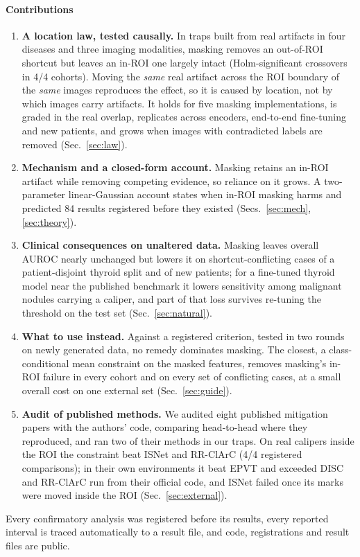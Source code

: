 \documentclass[review,3p]{elsarticle}
\begin{document}
\paragraph{Contributions}
\begin{enumerate}
\item \textbf{A location law, tested causally.} In traps built from real artifacts in four diseases and three imaging
modalities, masking removes an out-of-ROI shortcut but leaves an in-ROI one largely intact (Holm-significant
crossovers in 4/4 cohorts). Moving the \emph{same} real artifact across the ROI boundary of the \emph{same} images
reproduces the effect, so it is caused by location, not by which images carry artifacts. It holds for five masking
implementations, is graded in the real overlap, replicates across encoders, end-to-end fine-tuning and new patients,
and grows when images with contradicted labels are removed (Sec.~\ref{sec:law}).
\item \textbf{Mechanism and a closed-form account.} Masking retains an in-ROI artifact while removing competing
evidence, so reliance on it grows. A two-parameter linear-Gaussian account states when in-ROI masking harms and
predicted 84 results registered before they existed (Secs.~\ref{sec:mech}, \ref{sec:theory}).
\item \textbf{Clinical consequences on unaltered data.} Masking leaves overall AUROC nearly unchanged but lowers it on
shortcut-conflicting cases of a patient-disjoint thyroid split and of new patients; for a fine-tuned thyroid model near
the published benchmark it lowers sensitivity among malignant nodules carrying a caliper, and part of that loss survives
re-tuning the threshold on the test set (Sec.~\ref{sec:natural}).
\item \textbf{What to use instead.} Against a registered criterion, tested in two rounds on newly generated data, no
remedy dominates masking. The closest, a class-conditional mean constraint on the masked features, removes masking's
in-ROI failure in every cohort and on every set of conflicting cases, at a small overall cost on one external set
(Sec.~\ref{sec:guide}).
\item \textbf{Audit of published methods.} We audited eight published mitigation papers with the authors' code,
comparing head-to-head where they reproduced, and ran two of their methods in our traps. On real calipers inside the ROI the constraint beat ISNet and RR-ClArC (4/4 registered comparisons); in
their own environments it beat EPVT and exceeded DISC and RR-ClArC run from their official code, and ISNet failed once
its marks were moved inside the ROI (Sec.~\ref{sec:external}).
\end{enumerate}
Every confirmatory analysis was registered before its results, every reported interval is traced automatically to a
result file, and code, registrations and result files are public.
\end{document}
